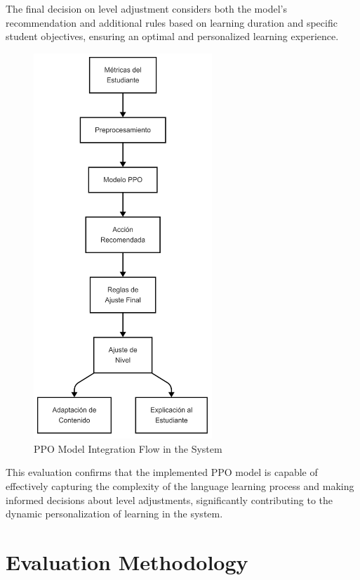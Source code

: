 The final decision on level adjustment considers both the model's recommendation and additional rules based on learning duration and specific student objectives, ensuring an optimal and personalized learning experience.

\begin{figure}[H]
    \centering
    \includegraphics[width=0.6\textwidth]{figuras/ppo-integration.png}
    \caption{PPO Model Integration Flow in the System}
    \label{fig:ppo-integration}
\end{figure}

This evaluation confirms that the implemented PPO model is capable of effectively capturing the complexity of the language learning process and making informed decisions about level adjustments, significantly contributing to the dynamic personalization of learning in the system.

\section{Evaluation Methodology}
\label{metodologia-evaluacion}

